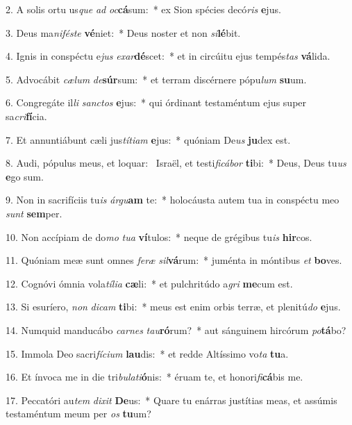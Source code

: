 2. A solis ortu us\textit{que} \textit{ad} \textit{oc}\textbf{cá}sum:~*  ex Sion spécies decó\textit{ris} \textbf{e}jus.\

3. Deus ma\textit{ni}\textit{fés}\textit{te} \textbf{vé}niet:~*  Deus noster et non \textit{si}\textbf{lé}bit.\

4. Ignis in conspéctu e\textit{jus} \textit{ex}\textit{ar}\textbf{dé}scet:~*  et in circúitu ejus tempés\textit{tas} \textbf{vá}lida.\

5. Advocábit \textit{cæ}\textit{lum} \textit{de}\textbf{súr}sum:~*  et terram discérnere pópu\textit{lum} \textbf{su}um.\

6. Congregáte il\textit{li} \textit{sanc}\textit{tos} \textbf{e}jus:~*  qui órdinant testaméntum ejus super sa\textit{cri}\textbf{fí}cia.\

7. Et annuntiábunt cæli jus\textit{tí}\textit{ti}\textit{am} \textbf{e}jus:~*  quóniam De\textit{us} \textbf{ju}dex est.\

8. Audi, pópulus meus, et loquar: \dag\  Israël, et testi\textit{fi}\textit{cá}\textit{bor} \textbf{ti}bi:~*  Deus, Deus tu\textit{us} \textbf{e}go sum.\

9. Non in sacrifíciis tu\textit{is} \textit{ár}\textit{gu}\textbf{am} te:~*  holocáusta autem tua in conspéctu meo \textit{sunt} \textbf{sem}per.\

10. Non accípiam de do\textit{mo} \textit{tu}\textit{a} \textbf{ví}tulos:~*  neque de grégibus tu\textit{is} \textbf{hir}cos.\

11. Quóniam meæ sunt omnes \textit{fe}\textit{ræ} \textit{sil}\textbf{vá}rum:~*  juménta in móntibus \textit{et} \textbf{bo}ves.\

12. Cognóvi ómnia vola\textit{tí}\textit{li}\textit{a} \textbf{cæ}li:~*  et pulchritúdo a\textit{gri} \textbf{me}cum est.\

13. Si esuríero, \textit{non} \textit{di}\textit{cam} \textbf{ti}bi:~*  meus est enim orbis terræ, et plenitú\textit{do} \textbf{e}jus.\

14. Numquid manducábo \textit{car}\textit{nes} \textit{tau}\textbf{ró}rum?~*  aut sánguinem hircórum \textit{po}\textbf{tá}bo?\

15. Immola Deo sacri\textit{fí}\textit{ci}\textit{um} \textbf{lau}dis:~*  et redde Altíssimo vo\textit{ta} \textbf{tu}a.\

16. Et ínvoca me in die tri\textit{bu}\textit{la}\textit{ti}\textbf{ó}nis:~*  éruam te, et honori\textit{fi}\textbf{cá}bis me.\

17. Peccatóri au\textit{tem} \textit{di}\textit{xit} \textbf{De}us:~*  Quare tu enárras justítias meas, et assúmis testaméntum meum per \textit{os} \textbf{tu}um?\

